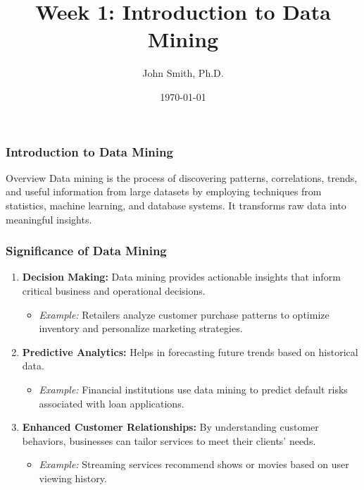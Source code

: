 \documentclass[aspectratio=169]{beamer}
\title[Week 1: Introduction to Data Mining]{Week 1: Introduction to Data Mining}
\author[J. Smith]{John Smith, Ph.D.}
\institute[University Name]{Department of Computer Science \\ University Name \\ Email: email@university.edu \\ Website: www.university.edu}
\date{\today}
\begin{document}
\frame{\titlepage}

\begin{frame}[fragile]
    \frametitle{Introduction to Data Mining}
    \begin{block}{Overview}
        Data mining is the process of discovering patterns, correlations, trends, and useful information from large datasets by employing techniques from statistics, machine learning, and database systems. 
        It transforms raw data into meaningful insights.
    \end{block}
\end{frame}

\begin{frame}[fragile]
    \frametitle{Significance of Data Mining}
    \begin{enumerate}
        \item \textbf{Decision Making:} Data mining provides actionable insights that inform critical business and operational decisions.
        \begin{itemize}
            \item \textit{Example:} Retailers analyze customer purchase patterns to optimize inventory and personalize marketing strategies.
        \end{itemize}
        
        \item \textbf{Predictive Analytics:} Helps in forecasting future trends based on historical data.
        \begin{itemize}
            \item \textit{Example:} Financial institutions use data mining to predict default risks associated with loan applications.
        \end{itemize}
        
        \item \textbf{Enhanced Customer Relationships:} By understanding customer behaviors, businesses can tailor services to meet their clients’ needs.
        \begin{itemize}
            \item \textit{Example:} Streaming services recommend shows or movies based on user viewing history.
        \end{itemize}
    \end{enumerate}
\end{frame}
\end{document}
